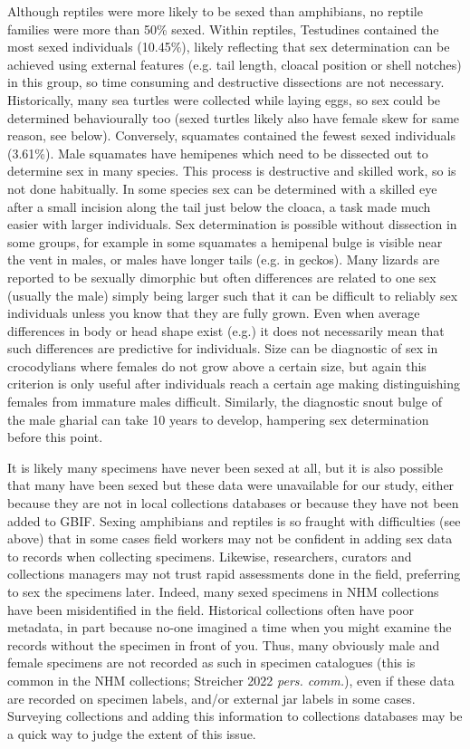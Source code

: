 \documentclass[a4paper, 12pt]{article}
\begin{document}
Although reptiles were more likely to be sexed than amphibians, no reptile families were more than 50\% sexed.
Within reptiles, Testudines contained the most sexed individuals (10.45\%), likely reflecting that sex determination can be achieved using external features (e.g. tail length, cloacal position or shell notches) in this group, so time consuming and destructive dissections are not necessary.
Historically, many sea turtles were collected while laying eggs, so sex could be determined behaviourally too (sexed turtles likely also have female skew for same reason, see below).
Conversely, squamates contained the fewest sexed individuals (3.61\%).
Male squamates have hemipenes which need to be dissected out to determine sex in many species\cite{pesantes1994method}.
This process is destructive and skilled work, so is not done habitually.
In some species sex can be determined with a skilled eye after a small incision along the tail just below the cloaca, a task made much easier with larger individuals. Sex determination is possible without dissection in some groups, for example in some squamates a hemipenal bulge is visible near the vent in males, or males have longer tails (e.g. in geckos). 
Many lizards are reported to be sexually dimorphic but often differences are related to one sex (usually the male) simply being larger such that it can be difficult to reliably sex individuals unless you know that they are fully grown.
Even when average differences in body or head shape exist (e.g.\cite{brana1996sexual,jones2020reproductive}) it does not necessarily mean that such differences are predictive for individuals.
Size can be diagnostic of sex in crocodylians where females do not grow above a certain size, but again this criterion is only useful after individuals reach a certain age making distinguishing females from immature males difficult.
Similarly, the diagnostic snout bulge of the male gharial can take 10 years to develop\cite{hone2020ontogeny}, hampering sex determination before this point. 

It is likely many specimens have never been sexed at all, but it is also possible that many have been sexed but these data were unavailable for our study, either because they are not in local collections databases or because they have not been added to GBIF. 
Sexing amphibians and reptiles is so fraught with difficulties (see above) that in some cases field workers may not be confident in adding sex data to records when collecting specimens. 
Likewise, researchers, curators and collections managers may not trust rapid assessments done in the field, preferring to sex the specimens later. 
Indeed, many sexed specimens in NHM collections have been misidentified in the field. 
Historical collections often have poor metadata, in part because no-one imagined a time when you might examine the records without the specimen in front of you. 
Thus, many obviously male and female specimens are not recorded as such in specimen catalogues (this is common in the NHM collections; Streicher 2022 \textit{pers. comm.}), even if these data are recorded on specimen labels, and/or external jar labels in some cases. 
Surveying collections and adding this information to collections databases may be a quick way to judge the extent of this issue.
\end{document}
